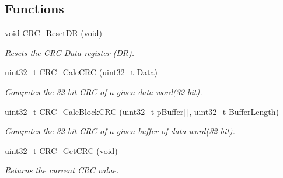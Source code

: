\subsection*{Functions}
\begin{DoxyCompactItemize}
\item 
\hyperlink{group___n_a_m_e_ga18028b8badbf1ea7e704ccac3c488e82}{void} \hyperlink{group___c_r_c___private___functions_ga506467d5ef873a5a4ade4ae83cb110f6}{C\-R\-C\-\_\-\-Reset\-D\-R} (\hyperlink{group___n_a_m_e_ga18028b8badbf1ea7e704ccac3c488e82}{void})
\begin{DoxyCompactList}\small\item\em Resets the C\-R\-C Data register (D\-R). \end{DoxyCompactList}\item 
\hyperlink{stdint_8h_a435d1572bf3f880d55459d9805097f62}{uint32\-\_\-t} \hyperlink{group___c_r_c___private___functions_ga5407fdbb8e8c9be6322cc8856ae5db3b}{C\-R\-C\-\_\-\-Calc\-C\-R\-C} (\hyperlink{stdint_8h_a435d1572bf3f880d55459d9805097f62}{uint32\-\_\-t} \hyperlink{group___copter_control_b_l_ga6f3335509cc4943e20df66f72483910c}{Data})
\begin{DoxyCompactList}\small\item\em Computes the 32-\/bit C\-R\-C of a given data word(32-\/bit). \end{DoxyCompactList}\item 
\hyperlink{stdint_8h_a435d1572bf3f880d55459d9805097f62}{uint32\-\_\-t} \hyperlink{group___c_r_c___private___functions_gab15ebf620615c360048fb4f45b15fae6}{C\-R\-C\-\_\-\-Calc\-Block\-C\-R\-C} (\hyperlink{stdint_8h_a435d1572bf3f880d55459d9805097f62}{uint32\-\_\-t} p\-Buffer\mbox{[}$\,$\mbox{]}, \hyperlink{stdint_8h_a435d1572bf3f880d55459d9805097f62}{uint32\-\_\-t} Buffer\-Length)
\begin{DoxyCompactList}\small\item\em Computes the 32-\/bit C\-R\-C of a given buffer of data word(32-\/bit). \end{DoxyCompactList}\item 
\hyperlink{stdint_8h_a435d1572bf3f880d55459d9805097f62}{uint32\-\_\-t} \hyperlink{group___c_r_c___private___functions_gab62db4561b0558f3c8ed53887fe7de8b}{C\-R\-C\-\_\-\-Get\-C\-R\-C} (\hyperlink{group___n_a_m_e_ga18028b8badbf1ea7e704ccac3c488e82}{void})
\begin{DoxyCompactList}\small\item\em Returns the current C\-R\-C value. \end{DoxyCompactList}\item 

\end{DoxyCompactItemize}
